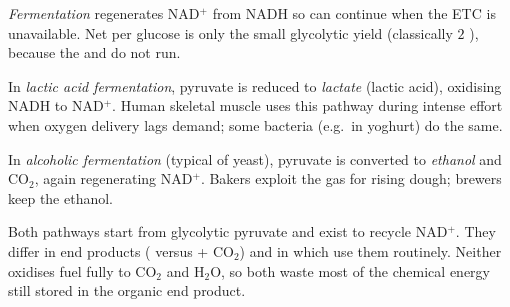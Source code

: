 \begin{definition}[Fermentation]\label{def:g10:cellular-respiration:ferment}
\emph{Fermentation} regenerates NAD$^+$ from NADH so
 can continue when the ETC is unavailable. Net  per glucose is
only the small glycolytic yield (classically $2$ ), because the 
and  do not run.
\end{definition}

\begin{definition}
\label{def:g10:cellular-respiration:lactic}
In \emph{lactic acid fermentation}, pyruvate
is reduced to \emph{lactate} (lactic acid), oxidising NADH to
NAD$^+$. Human skeletal muscle uses this pathway during intense effort when
oxygen delivery lags  demand; some bacteria (e.g.\ in yoghurt) do the same.
\end{definition}

\begin{definition}
\label{def:g10:cellular-respiration:alcoholic}
In \emph{alcoholic fermentation} (typical of
yeast), pyruvate is converted to \emph{ethanol} and
$\mathrm{CO_2}$, again regenerating NAD$^+$. Bakers exploit the gas for
rising dough; brewers keep the ethanol.
\end{definition}

\begin{proposition}\label{prop:g10:cellular-respiration:ferm-compare}
Both pathways start from glycolytic pyruvate and exist to recycle NAD$^+$.
They differ in end products ( versus  + $\mathrm{CO_2}$) and in
which  use them routinely. Neither oxidises fuel fully to
$\mathrm{CO_2}$ and $\mathrm{H_2O}$, so both waste most of the chemical energy
still stored in the organic end product.
\end{proposition}
\admitted

